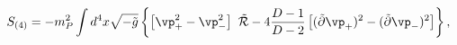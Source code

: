 \begin{equation}
    S_{(4)}= - m_P^2 \int d^4 x \sqrt{-\tilde g}
    \left\{ \left[\vp_+^2-\vp_-^2\right]\ \tilde{\cal R}
        - 4{D-1\over D-2} \left[(\tilde\partial  \vp_+)^2
            - (\tilde\partial \vp_-)^2 \right]
    \right\},
    \label{modulikin}
\end{equation}

